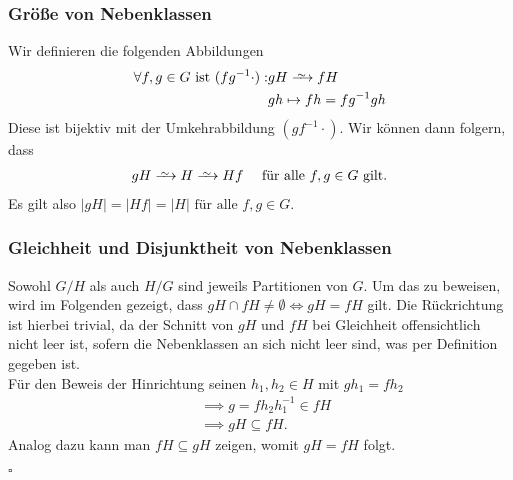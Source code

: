 \documentclass[12pt, german]{article}
\newcommand\iso{\xrightarrow{
		\,\smash{\raisebox{-0.65ex}{\ensuremath{\scriptstyle\sim}}}\,}}
\newcommand{\bewiesen}{
	
	\begin{flushright}
		$\square$  \\
\end{flushright}}
\begin{document}
	\subsubsection{Grö\ss e von Nebenklassen}
	Wir definieren die folgenden Abbildungen
	\begin{align*}
		\forall f,g \in G \text{ ist } (fg^{-1} \cdot):& gH \iso fH \\
		& gh \mapsto fh = fg^{-1}gh
	\end{align*}
	Diese ist bijektiv mit der Umkehrabbildung $(gf^{-1}\cdot)$.
	Wir können dann folgern, dass 
	\begin{align*}
		gH \iso H \iso Hf \quad \text{ für alle } f,g \in G \text{ gilt.}
	\end{align*}
	Es gilt also $|gH| = |Hf| = |H|\text{ für alle } f,g \in G$.
	
	\subsubsection{Gleichheit und Disjunktheit von Nebenklassen}
	Sowohl $G/H$ als auch $H/G$ sind jeweils Partitionen von $G$.
	Um das zu beweisen, wird im Folgenden gezeigt, dass $gH \cap fH \not = \emptyset \iff gH = fH$ gilt.
	Die Rückrichtung ist hierbei trivial, da der Schnitt von $gH$ und $fH$ bei Gleichheit offensichtlich nicht leer ist, sofern die Nebenklassen an sich nicht leer sind, was per Definition gegeben ist. \\
	
	Für den Beweis der Hinrichtung seinen $h_1, h_2 \in H$ mit $gh_1 = fh_2$
	\begin{align*}
		&\implies g=fh_2h_1^{-1} \in fH \\
		&\implies gH \subseteq fH. 
	\end{align*}
	Analog dazu kann man $fH \subseteq gH$ zeigen, womit $gH = fH$ folgt.
	\bewiesen
	
\end{document}
